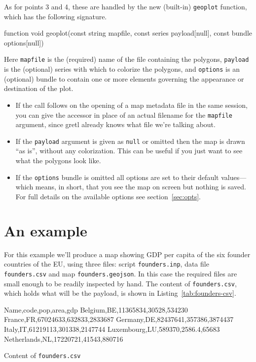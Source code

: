 \documentclass{article}
\begin{document}
As for points 3 and 4, these are handled by the new (built-in)
\texttt{geoplot} function, which has the following signature.
\begin{code}
function void geoplot(const string mapfile,
	              const series payload[null],
	              const bundle options[null])
\end{code}
Here \texttt{mapfile} is the (required) name of the file containing
the polygons, \texttt{payload} is the (optional) series with which to
colorize the polygons, and \texttt{options} is an (optional) bundle to
contain one or more elements governing the appearance or destination
of the plot.
\begin{itemize}
\item If the  call follows on the opening of a map
  metadata file in the same session, you can give the accessor
   in place of an actual filename for the
  \texttt{mapfile} argument, since gretl already knows what file we're
  talking about.
\item If the \texttt{payload} argument is given as \texttt{null} or
  omitted then the map is drawn ``as is'', without any
  colorization. This can be useful if you just want to see what the
  polygons look like.
\item If the \texttt{options} bundle is omitted all options are set to
  their default values---which means, in short, that you see the map
  on screen but nothing is saved. For full details on the available
  options see section~\ref{sec:opts}.
\end{itemize}

\section{An example}
\label{sec:example}

For this example we'll produce a map showing GDP per capita of the six
founder countries of the EU, using three files: script
\texttt{founders.inp}, data file \texttt{founders.csv} and map
\texttt{founders.geojson}. In this case the required files are small
enough to be readily inspected by hand.  The content of
\texttt{founders.csv}, which holds what will be the payload, is shown
in Listing~\ref{tab:founders-csv}.

\begin{script}[htbp]
\begin{scode}
Name,code,pop,area,gdp
Belgium,BE,11365834,30528,534230
France,FR,67024633,632833,2833687
Germany,DE,82437641,357386,3874437
Italy,IT,61219113,301338,2147744
Luxembourg,LU,589370,2586.4,65683
Netherlands,NL,17220721,41543,880716
\end{scode}
\caption{Content of \texttt{founders.csv}}
\label{tab:founders-csv}
\end{script}
\end{document}
